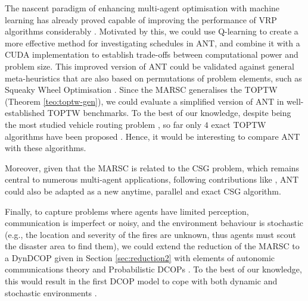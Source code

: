 The nascent paradigm of enhancing multi-agent optimisation with machine learning has
already proved capable of improving the performance of VRP algorithms considerably
\cite{bai2021}. Motivated by this, we could use Q-learning to create a more effective
method for investigating schedules in ANT, and combine it with a CUDA implementation to
establish trade-offs between computational power and problem size.
This improved version of ANT could be validated against general meta-heuristics
that are also based on permutations of problem elements, such as Squeaky Wheel
Optimisation \cite{joslin1999}.
Since the MARSC generalises the TOPTW (Theorem \ref{teo:toptw-gen}), we could evaluate a
simplified version of ANT in well-established TOPTW benchmarks. To the best of our
knowledge, despite being the most studied vehicle routing problem \cite{top2019}, so far
only $4$ exact TOPTW algorithms have been proposed
\cite{boussier2007,tae2015,el-hajj2015,gedik2017}. Hence, it would be interesting to
compare ANT with these algorithms.
\iffalse
\cite{boussier2007,tae2015} use a branch-and-price method;
\cite{el-hajj2015} is based on column generation and dynamic programming, and
\cite{gedik2017} uses constraint programming.
Since ANT accumulates information about smaller subproblems (optimality of
$k$-permutations of tasks) to solve larger problems (MARSC instances), it can be
considered a dynamic programming algorithm \cite[Chapter $15$]{cormen2009}.
\fi
Moreover, given that the MARSC is related to the CSG problem, which remains central to
numerous multi-agent applications, following contributions like
\cite{agarwal2015,svensson2013,ueda2010}, ANT could also be adapted as a new anytime,
parallel and exact CSG algorithm.

Finally, to capture problems where agents have limited perception, communication is
imperfect or noisy, and the environment behaviour is stochastic (e.g., the location and
severity of the fires are unknown, thus agents must scout the disaster area to find them),
we could extend the reduction of the MARSC to a DynDCOP given in Section
\ref{sec:reduction2} with elements of autonomic communications theory
\cite{dobson2006survey} and Probabilistic DCOPs \cite[Section $6$]{fioretto2018survey}. To
the best of our knowledge, this would result in the first DCOP model to cope with both
dynamic and stochastic environments \cite[Section $9.1$]{fioretto2018survey}.


